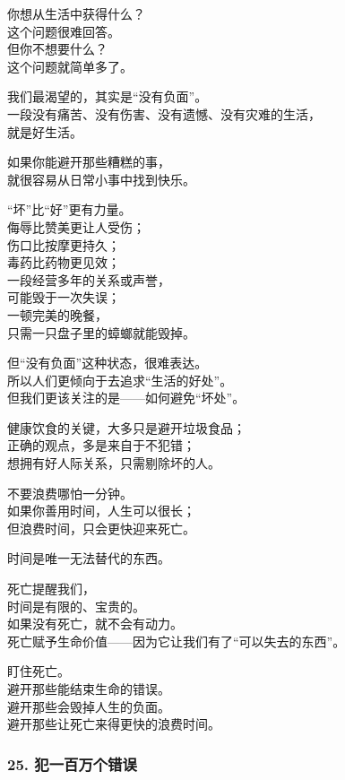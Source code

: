 \documentclass[
]{article}
\begin{document}
你想从生活中获得什么？\\
这个问题很难回答。\\
但你不想要什么？\\
这个问题就简单多了。

我们最渴望的，其实是``没有负面''。\\
一段没有痛苦、没有伤害、没有遗憾、没有灾难的生活，\\
就是好生活。

如果你能避开那些糟糕的事，\\
就很容易从日常小事中找到快乐。

``坏''比``好''更有力量。\\
侮辱比赞美更让人受伤；\\
伤口比按摩更持久；\\
毒药比药物更见效；\\
一段经营多年的关系或声誉，\\
可能毁于一次失误；\\
一顿完美的晚餐，\\
只需一只盘子里的蟑螂就能毁掉。

但``没有负面''这种状态，很难表达。\\
所以人们更倾向于去追求``生活的好处''。\\
但我们更该关注的是------如何避免``坏处''。

健康饮食的关键，大多只是避开垃圾食品；\\
正确的观点，多是来自于不犯错；\\
想拥有好人际关系，只需剔除坏的人。

不要浪费哪怕一分钟。\\
如果你善用时间，人生可以很长；\\
但浪费时间，只会更快迎来死亡。

时间是唯一无法替代的东西。

死亡提醒我们，\\
时间是有限的、宝贵的。\\
如果没有死亡，就不会有动力。\\
死亡赋予生命价值------因为它让我们有了``可以失去的东西''。

盯住死亡。\\
避开那些能结束生命的错误。\\
避开那些会毁掉人生的负面。\\
避开那些让死亡来得更快的浪费时间。

\subsubsection{25.
犯一百万个错误}\label{25-ux72afux4e00ux767eux4e07ux4e2aux9519ux8bef}
\end{document}
